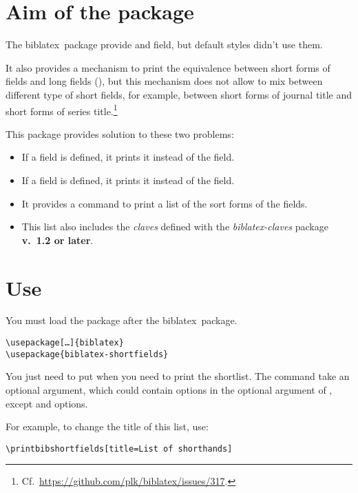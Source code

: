 \documentclass{ltxdockit}[2011/03/25]
\newcommand{\biblatex}{biblatex\xspace}
\begin{document}
\printtitlepage
\tableofcontents


\section{Aim of the package}

The \biblatex\ package provide  and  field, but default styles didn't use them.

It also provides a mechanism to print the equivalence between short forms of fields and long fields (), but this mechanism does not allow to mix between different type of short fields, for example, between short forms of journal title and short forms  of series title.\footnote{Cf.~\url{https://github.com/plk/biblatex/issues/317}.}

This package provides solution to these two problems:
\begin{itemize}
	\item If a  field is defined, it prints it instead of the  field.
	\item If a  field is defined, it prints it instead of the  field.
	\item It provides a  command to print a list of the sort forms of the fields.
	\item This list also includes the \emph{claves} defined with the \emph{biblatex-claves} package \textbf{v.~1.2 or later}.
\end{itemize}

\section{Use}

You must load the package after the \biblatex\ package.
\begin{verbatim}
\usepackage[…]{biblatex}
\usepackage{biblatex-shortfields}
\end{verbatim}

You just need to put  when you need to print the shortlist. The command take an optional argument, which could contain  options in the optional argument of , except  and  options.

For example, to change the title of this list, use:

\begin{verbatim}
\printbibshortfields[title=List of shorthands]
\end{verbatim}
\end{document}

